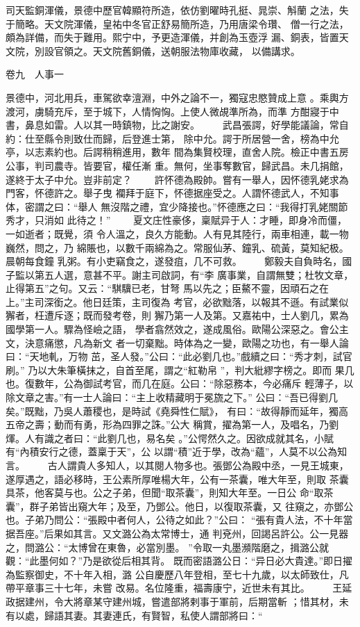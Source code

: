 \documentclass{ctexart}
\begin{document}
司天監銅渾儀，景德中歷官韓顯符所造，依仿劉曜時孔挺、晁崇、斛蘭 之法，失于簡略。天文院渾儀，皇祐中冬官正舒易簡所造，乃用唐梁令瓚、 僧一行之法，頗為詳備，而失于難用。熙宁中，予更造渾儀，并創為玉壺浮 漏、銅表，皆置天文院，別設官領之。天文院舊銅儀，送朝服法物庫收藏， 以備講求。

卷九　人事一

景德中，河北用兵，車駕欲幸澶淵，中外之論不一，獨寇忠愍贊成上意 。乘輿方渡河，虜騎充斥，至于城下，人情恟恟。上使人微覘準所為，而準 方酣寢于中書，鼻息如雷。人以其一時鎮物，比之謝安。 　　武昌張諤，好學能議論，常自約：仕至縣令則致仕而歸，后登進士第， 除中允。諤于所居營一舍，榜為中允亭，以志素約也。后諤稍稍進用，數年 間為集賢校理，直舍人院。檢正中書五房公事，判司農寺。皆要官，權任漸 重。無何，坐事奪數官，歸武昌。未几捐館，遂終于太子中允。豈非前定？ 　　許怀德為殿帥。嘗有一舉人，因怀德乳姥求為門客，怀德許之。舉子曳 襴拜于庭下，怀德据座受之。人謂怀德武人，不知事体，密謂之曰：``舉人 無沒階之禮，宜少降接也。''怀德應之曰：``我得打乳姥關節秀才，只消如 此待之！'' 　　夏文庄性豪侈，稟賦异于人：才睡，即身冷而僵，一如逝者；既覺，須 令人溫之，良久方能動。人有見其陸行，兩車相連，載一物巍然，問之，乃 綿賬也，以數千兩綿為之。常服仙茅、鐘乳、硫黃，莫知紀极。晨朝每食鐘 乳粥。有小吏竊食之，遂發疽，几不可救。 　　鄭毅夫自負時名，國子監以第五人選，意甚不平。謝主司啟詞，有``李 廣事業，自謂無雙；杜牧文章，止得第五''之句。又云：``騏驥已老，甘弩 馬以先之；臣鰲不靈，因頑石之在上。''主司深銜之。他日廷策，主司復為 考官，必欲黜落，以報其不遜。有試業似獬者，枉遭斥逐；既而發考卷，則 獬乃第一人及第。又嘉祐中，士人劉几，累為國學第一人。驟為怪嶮之語， 學者翕然效之，遂成風俗。歐陽公深惡之。會公主文，決意痛懲，凡為新文 者一切棄黜。時体為之一變，歐陽之功也，有一舉人論曰：``天地軋，万物 茁，圣人發。''公曰：``此必劉几也。''戲續之曰：``秀才刺，試官刷。'' 乃以大朱筆橫抹之，自首至尾，謂之``紅勒帛 ''，判大紕繆字榜之。即而 果几也。復數年，公為御試考官，而几在庭。公曰：``除惡務本，今必痛斥 輕薄子，以除文章之害。''有一士人論曰：``主上收精藏明于冕旒之下。'' 公曰：``吾已得劉几矣。''既黜，乃吳人蕭稷也，是時試《堯舜性仁賦》， 有曰：``故得靜而延年，獨高五帝之壽；動而有勇，形為四罪之誅。''公大 稱賞，擢為第一人，及唱名，乃劉煇。人有識之者曰：``此劉几也，易名矣 。''公愕然久之。因欲成就其名，小賦有``內積安行之德，蓋稟于天''，公 以謂``積''近于學，改為``蘊''，人莫不以公為知言。 　　古人謂貴人多知人，以其閱人物多也。張鄧公為殿中丞，一見王城東， 遂厚遇之，語必移時，王公素所厚唯楊大年，公有一茶囊，唯大年至，則取 茶囊具茶，他客莫与也。公之子弟，但聞``取茶囊''，則知大年至。一日公 命``取茶囊''，群子弟皆出窺大年；及至，乃鄧公。他日，以復取茶囊，又 往窺之，亦鄧公也。子弟乃問公：``張殿中者何人，公待之如此？''公曰： ``張有貴人法，不十年當据吾座。''后果如其言。又文潞公為太常博士，通 判兗州，回謁呂許公。公一見器之，問潞公：``太博曾在東魯，必當別墨。 ''令取一丸墨瀕階磨之，揖潞公就觀：``此墨何如？''乃是欲從后相其背。 既而密語潞公日：``异日必大貴達。''即日擢為監察御史，不十年入相，潞 公自慶歷八年登相，至七十九歲，以太師致仕，凡帶平章事三十七年，未嘗 改易。名位隆重，福壽康宁，近世未有其比。 　　王延政据建州，令大將章某守建州城，嘗遣部將剌事于軍前，后期當斬 ；惜其材，未有以處，歸語其妻。其妻連氏，有賢智，私使人謂部將曰：`` 
\end{document}
